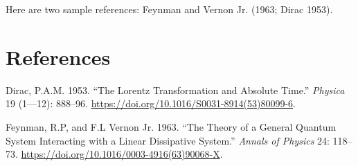 \documentclass[]{elsarticle} %
\begin{document}
Here are two sample references: Feynman and Vernon Jr. (1963; Dirac
1953).

\hypertarget{references}{%
\section*{References}\label{references}}

\hypertarget{refs}{}
\leavevmode\hypertarget{ref-Dirac1953888}{}%
Dirac, P.A.M. 1953. ``The Lorentz Transformation and Absolute Time.''
\emph{Physica} 19 (1---12): 888--96.
\url{https://doi.org/10.1016/S0031-8914(53)80099-6}.

\leavevmode\hypertarget{ref-Feynman1963118}{}%
Feynman, R.P, and F.L Vernon Jr. 1963. ``The Theory of a General Quantum
System Interacting with a Linear Dissipative System.'' \emph{Annals of
Physics} 24: 118--73.
\url{https://doi.org/10.1016/0003-4916(63)90068-X}.
\end{document}
